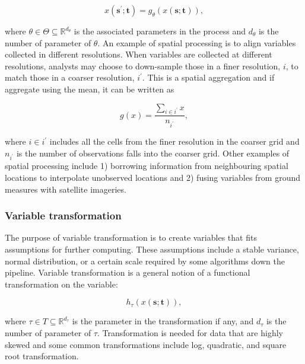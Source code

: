 \documentclass[
]{interact}
\begin{document}
\begin{equation}
x(\mathbf{s}^\prime;\mathbf{t}) = g_{\mathcal{\theta}}(x(\mathbf{s};\mathbf{t})),
\end{equation}

where \(\theta \in \Theta \subseteq \mathbb{R}^{d_{\theta}}\) is the
associated parameters in the process and \(d_{\theta}\) is the number of
parameter of \(\theta\). An example of spatial processing is to align
variables collected in different resolutions. When variables are
collected at different resolutions, analysts may choose to down-sample
those in a finer resolution, \(i\), to match those in a coarser
resolution, \(i^\prime\). This is a spatial aggregation and if aggregate
using the mean, it can be written as

\begin{equation}
g(x) = \frac{\sum_{i \in i^\prime}x}{n_{i^\prime}},
\end{equation}

where \(i \in i^\prime\) includes all the cells from the finer
resolution in the coarser grid and \(n_{i^\prime}\) is the number of
observations falls into the coarser grid. Other examples of spatial
processing include 1) borrowing information from neighbouring spatial
locations to interpolate unobserved locations and 2) fusing variables
from ground measures with satellite imageries.

\hypertarget{variable-transformation}{%
\subsubsection{Variable transformation}\label{variable-transformation}}

The purpose of variable transformation is to create variables that fits
assumptions for further computing. These assumptions include a stable
variance, normal distribution, or a certain scale required by some
algorithms down the pipeline. Variable transformation is a general
notion of a functional transformation on the variable:

\begin{equation}
h_{\tau}(x(\mathbf{s};\mathbf{t})),
\end{equation}

where \(\tau \in T \subseteq \mathbb{R}^{d_{\tau}}\) is the parameter in
the transformation if any, and \(d_{\tau}\) is the number of parameter
of \(\tau\). Transformation is needed for data that are highly skewed
and some common transformations include log, quadratic, and square root
transformation.
\end{document}

